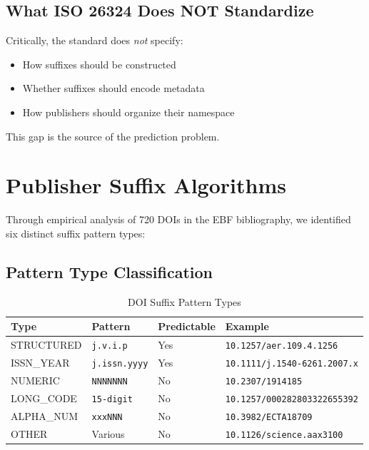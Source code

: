 \subsection{What ISO 26324 Does NOT Standardize}

Critically, the standard does \emph{not} specify:

\begin{itemize}
    \item How suffixes should be constructed
    \item Whether suffixes should encode metadata
    \item How publishers should organize their namespace
\end{itemize}

This gap is the source of the prediction problem.

\section{Publisher Suffix Algorithms}
\label{sec:publisher-algorithms}

Through empirical analysis of 720 DOIs in the EBF bibliography, we identified six distinct suffix pattern types:

\subsection{Pattern Type Classification}

\begin{table}[h]
\centering
\caption{DOI Suffix Pattern Types}
\label{tab:pattern-types}
\begin{tabular}{llll}
\toprule
\textbf{Type} & \textbf{Pattern} & \textbf{Predictable} & \textbf{Example} \\
\midrule
STRUCTURED & \texttt{j.v.i.p} & Yes & \texttt{10.1257/aer.109.4.1256} \\
ISSN\_YEAR & \texttt{j.issn.yyyy} & Yes & \texttt{10.1111/j.1540-6261.2007.x} \\
NUMERIC & \texttt{NNNNNNN} & No & \texttt{10.2307/1914185} \\
LONG\_CODE & \texttt{15-digit} & No & \texttt{10.1257/000282803322655392} \\
ALPHA\_NUM & \texttt{xxxNNN} & No & \texttt{10.3982/ECTA18709} \\
OTHER & Various & No & \texttt{10.1126/science.aax3100} \\
\bottomrule
\end{tabular}
\end{table}

